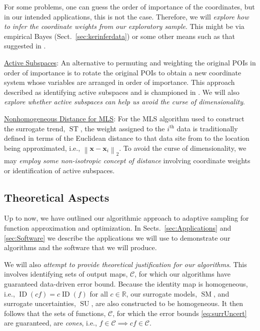 \documentclass[11pt]{NSFamsart}
\newcommand{\Upara}[1]{\noindent\underline{\upshape #1}:}
\DeclareMathOperator{\SURR}{SM} %
\DeclareMathOperator{\STREND}{ST} %
\DeclareMathOperator{\ID}{ID}
\DeclareMathOperator{\SURRERR}{SU}
\newcommand{\reals}{{\mathbb{R}}}
\newcommand{\bx}{{\boldsymbol{x}}}
\newcommand{\calc}{{\mathcal{C}}}
\newcommand{\norm}[2][{}]{\ensuremath{\left \lVert #2 \right \rVert}_{#1}}
\begin{document}
For some problems, one can guess the order of importance of the coordinates, but in our intended applications, this is not the case. Therefore, we will \emph{explore how to infer the coordinate weights from our exploratory sample}. This might be via empirical Bayes (Sect.\ \ref{sec:kerinferdata}) or some other means such as that suggested in \cite{DinHic20a}.

\Upara{Active Subspaces}
An alternative to permuting and weighting the original POIs in order of importance is to rotate the original POIs to obtain a new coordinate system whose variables are arranged in order of importance. This approach described as identifying active subspaces and is championed in \cite{constantine2015active}. We will also \emph{explore whether active subspaces can help us avoid the curse of dimensionality}.

\Upara{Nonhomogeneous Distance for MLS}
For the MLS algorithm used to construct the surrogate trend, $\STREND$, the weight assigned to the $i^{\text{th}}$ data is traditionally defined in terms of the Euclidean distance to that data site from to the location being approximated, i.e., $\norm[2]{\bx - \bx_i}$. To avoid the curse of dimensionality, we may \emph{employ some non-isotropic concept of distance} involving coordinate weights or identification of active subspaces.


\subsection{Theoretical Aspects}

Up to now, we have outlined our algorithmic approach to adaptive sampling for function approximation and optimization. In Sects.\ \ref{sec:Applications} and \ref{sec:Software} we describe the applications we will use to demonstrate our algorithms and the software that we will produce.

We will also \emph{attempt to provide theoretical justification for our algorithms}. This involves identifying sets of output maps, $\calc$, for which our algorithms have guaranteed data-driven error bound. Because the identity map is homogeneous, i.e., $\ID(cf) = c\ID(f)$ for all $c \in \reals$, our surrogate models, $\SURR$, and surrogate uncertainties, $\SURRERR$, are also constructed to be homogeneous. It then follows that the sets of functions, $\calc$, for which the error bounds \eqref{eq:surrUncert} are guaranteed, are \emph{cones}, i.e., $f \in \calc \implies cf \in \calc$.
\end{document}
